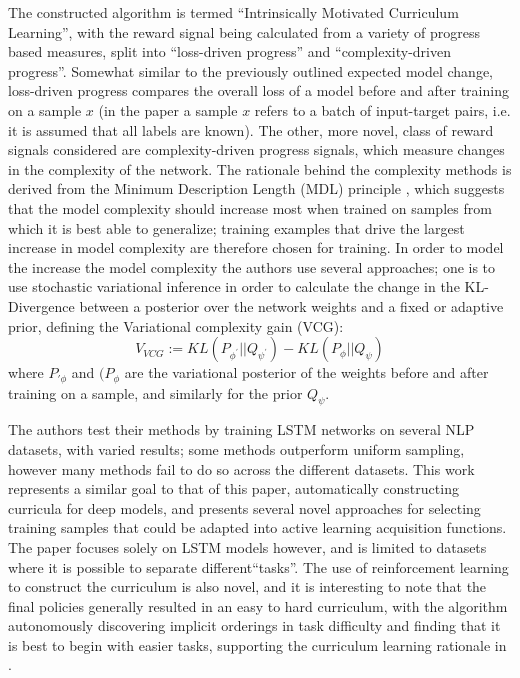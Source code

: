 \documentclass[a4paper,10pt]{article}
\begin{document}
The constructed algorithm is termed ``Intrinsically Motivated Curriculum Learning'', with the reward signal being calculated from a variety of progress based measures, split into ``loss-driven progress'' and ``complexity-driven progress''. Somewhat similar to the previously outlined expected model change, loss-driven progress compares the overall loss of a model before and after training on a sample $x$ (in the paper a sample $x$ refers to a batch of input-target pairs, i.e. it is assumed that all labels are known). The other, more novel, class of reward signals considered are complexity-driven progress signals, which measure changes in the complexity of the network. The rationale behind the complexity methods is derived from the Minimum Description Length (MDL) principle \cite{Grunwald 2007}, which suggests that the model complexity should increase most when trained on samples from which it is best able to generalize; training examples that drive the largest increase in model complexity are therefore chosen for training. In order to model the increase the model complexity the authors use several approaches; one is to use stochastic variational inference \cite{Kingma 2015} in order to calculate the change in the KL-Divergence between a posterior over the network weights and a fixed or adaptive prior, defining the Variational complexity gain (VCG):
\begin{equation}
V_{VCG} := KL(P_{\phi^{\prime}} || Q_{\psi^{\prime}}) - KL(P_{\phi} || Q_{\psi})
\end{equation}
where $P_{\prime{\phi}}$ and $(P_{\phi}$ are the variational posterior of the weights before and after training on a sample, and similarly for the prior $Q_{\psi}$.

The authors test their methods by training LSTM networks on several NLP datasets, with varied results; some methods outperform uniform sampling, however many methods fail to do so across the different datasets. This work represents a similar goal to that of this paper, automatically constructing curricula for deep models, and presents several novel approaches for selecting training samples that could be adapted into active learning acquisition functions. The paper focuses solely on LSTM models however, and is limited to datasets where it is possible to separate different``tasks''. The use of reinforcement learning to construct the curriculum is also novel, and it is interesting to note that the final policies generally resulted in an easy to hard curriculum, with the algorithm autonomously discovering implicit orderings in task difficulty and finding that it is best to begin with easier tasks, supporting the curriculum learning rationale in \cite{Bengio 09}.
\end{document}
